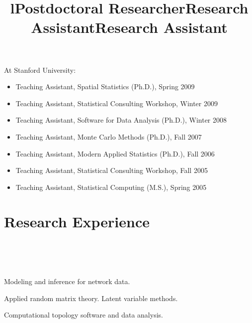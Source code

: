 \documentclass[overlapped,line,letterpaper]{res}
\begin{document}
\begin{resume}
At Stanford University:

\begin{itemize}
\item Teaching Assistant, Spatial Statistics (Ph.D.), Spring 2009
\item Teaching Assistant, Statistical Consulting Workshop, Winter 2009
\item Teaching Assistant, Software for Data Analysis (Ph.D.), Winter 2008
\item Teaching Assistant, Monte Carlo Methods (Ph.D.), Fall 2007
\item Teaching Assistant, Modern Applied Statistics (Ph.D.), Fall 2006
\item Teaching Assistant, Statistical Consulting Workshop, Fall 2005
\item Teaching Assistant, Statistical Computing (M.S.), Spring 2005
\end{itemize}


\section{\bf Research Experience}

\begin{format}
\title{l}\\
\\
\body\\
\end{format}

\title{Postdoctoral Researcher}
\begin{position}
  Modeling and inference for network data.
\end{position}

\title{Research Assistant}
\begin{position}
  Applied random matrix theory.  Latent variable methods.
\end{position}

\title{Research Assistant}
\begin{position}
  Computational topology software and data analysis.
\end{position}



\end{resume}
\end{document}
